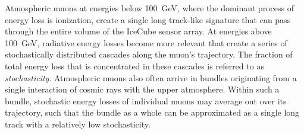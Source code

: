 Atmospheric muons at energies below 100~GeV, where the dominant process of energy loss is ionization, create a single long track-like signature that can pass through the entire volume of the IceCube sensor array. At energies above 100~GeV, radiative energy losses become more relevant that create a series of stochastically distributed cascades along the muon's trajectory. The fraction of total energy loss that is concentrated in these cascades is referred to as \emph{stochasticity}. Atmospheric muons also often arrive in bundles originating from a single interaction of cosmic rays with the upper atmosphere. Within such a bundle, stochastic energy losses of individual muons may average out over its trajectory, such that the bundle as a whole can be approximated as a single long track with a relatively low stochasticity.
